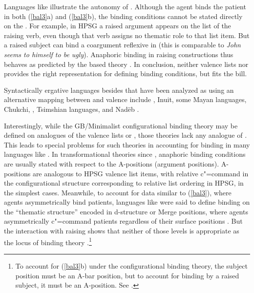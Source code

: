 \documentclass[output=paper,biblatex,babelshorthands,newtxmath,draftmode,colorlinks, citecolor=brown]{langscibook}
\begin{document}
\largerpage[1.5]
\noindent
Languages like  illustrate the autonomy of \argst.  Although the agent binds the
patient in both (\ref{bal3}a) and (\ref{bal3}b), the binding conditions cannot be stated directly on
the .  For example, in HPSG a raised
argument appears on the \argst list of the raising verb, even though that verb assigns no thematic
role to that list item.
But a raised subject can bind a coargument reflexive in  (this is comparable to
 \textit{John seems to himself to be ugly}).  Anaphoric binding in 
raising constructions thus behaves as predicted by the \argst based theory \citep{Wechsler1999}.  In
conclusion, neither valence lists nor \content provides the right representation for defining binding
conditions, but \argst fits the bill.


Syntactically ergative languages besides  that have been analyzed as using an
alternative mapping between \argst and valence include , Inuit, some Mayan languages,
Chukchi, , Tsimshian languages, and Nad{\"e}b \citep{Manning1996,Manning+Sag:1999}.

Interestingly, while the GB/Minimalist configurational binding theory may be defined on analogues of
the valence lists or \content, those theories lack any analogue of \argst.  This leads to special problems for
such theories in accounting for binding in many  languages like .
In transformational theories since \citet{Chomsky:1981}, anaphoric binding conditions are usually
stated with respect to the A-positions (argument positions).  A-positions are analogous to HPSG
valence list items, with relative c"=command in the configurational structure corresponding to relative
list ordering in HPSG, in the simplest cases.  Meanwhile, to account for data similar to
(\ref{bal3}), where agents asymmetrically bind patients,  languages like
 were said to define binding on the ``thematic structure'' encoded in d-structure or
Merge positions, where agents asymmetrically c"=command patients regardless of their surface
positions \citep{Guilfoyle+etal:1992}.  But the interaction with raising shows that neither of those
levels is appropriate as the locus of binding theory \citep{Wechsler1999}.\footnote{To account for
  (\ref{bal3}b) under the configurational binding theory, the subject position must be an A-bar
  position, but to account for binding by a raised subject, it must be an A-position.  See
  \citet{Wechsler1999}. }
%
\end{document}
